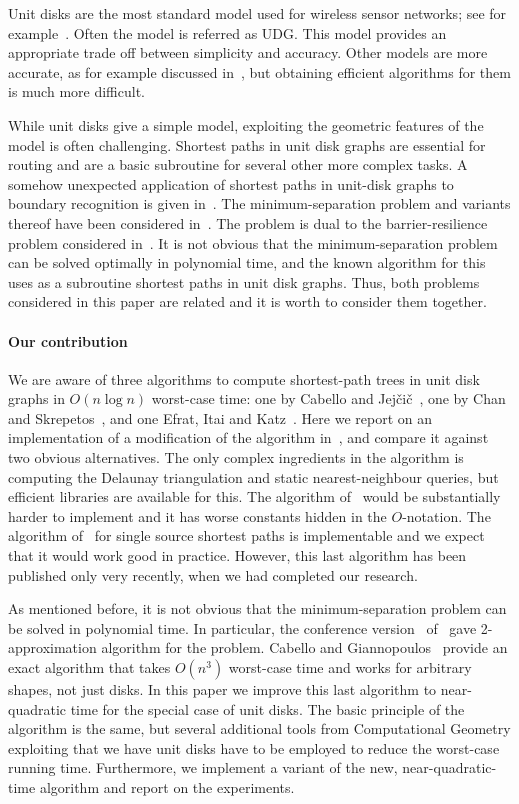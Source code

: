 \documentclass[a4paper,11pt]{article}
\begin{document}
Unit disks are the most standard model used for wireless sensor networks; 
see for example~\cite{GG11,HS95,zg-wsn-04}. 
Often the model is referred as UDG.
This model provides an appropriate trade off between simplicity and accuracy. 
Other models are more accurate, as for example discussed in~\cite{KWZ03,LP10},
but obtaining efficient algorithms for them is much more difficult.

While unit disks give a simple model, exploiting the geometric features 
of the model is often challenging. 
Shortest paths in unit disk graphs are essential for routing and
are a basic subroutine for several other more complex tasks. 
A somehow unexpected application of shortest paths in unit-disk graphs
to boundary recognition is given in~\cite{WGM06}.
The minimum-separation problem and variants thereof have been considered 
in~\cite{CG16,gkpvv-16}. 
The problem is dual to the barrier-resilience problem considered in~\cite{BK09,KH07,KLA07}.
It is not obvious that the minimum-separation problem can be solved optimally
in polynomial time, and the known algorithm for this uses as a subroutine 
shortest paths in unit disk graphs. 
Thus, both problems considered in this paper are related and it is worth to 
consider them together.


\paragraph{Our contribution}
We are aware of three algorithms to compute shortest-path trees in unit disk graphs in
$O(n\log n)$ worst-case time: one by Cabello and Jej\v{c}i\v{c}~\cite{CJ15}, 
one by Chan and Skrepetos~\cite{ChanS16}, and one Efrat, Itai and Katz~\cite{eik-01}. 
Here we report on an implementation of a modification of the algorithm in~\cite{CJ15},
and compare it against two obvious alternatives.
The only complex ingredients in the algorithm is computing the Delaunay triangulation
and static nearest-neighbour queries, but efficient libraries are available for this.
The algorithm of~\cite{eik-01} would be substantially harder to implement 
and it has worse constants hidden in the $O$-notation. The algorithm of~\cite{ChanS16}
for single source shortest paths is implementable and we expect that it would work
good in practice. However, this last algorithm has been published only
very recently, when we had completed our research.

As mentioned before, it is not obvious that the minimum-separation problem 
can be solved in polynomial time. 
In particular, the conference version~\cite{gkv-ipud-11} of~\cite{gkpvv-16} gave
2-approximation algorithm for the problem. 
Cabello and Giannopoulos~\cite{CG16} provide an exact algorithm that takes $O(n^3)$ 
worst-case time and works for arbitrary shapes, not just disks. 
In this paper we improve this last algorithm to near-quadratic time for the 
special case of unit disks. 
The basic principle of the algorithm is the same, but several additional tools
from Computational Geometry exploiting that we have unit disks
have to be employed to reduce the worst-case running time. 
Furthermore, we implement a variant of the new, near-quadratic-time algorithm and report
on the experiments.
\end{document}

